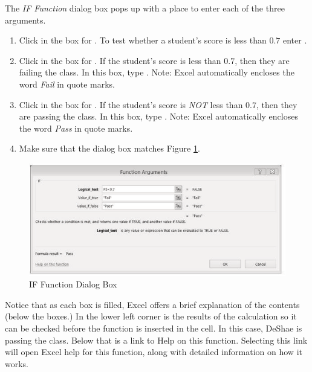The \textit{IF Function} dialog box pops up with a place to enter each of the three arguments.

\begin{enumbox}
	\begin{enumerate}
		\item Click in the box for . To test whether a student's score is less than $ 0.7 $ enter .
		\item Click in the box for . If the student's score is less than $ 0.7 $, then they are failing the class. In this box, type . Note: Excel automatically encloses the word \textit{Fail} in quote marks.
		\item Click in the box for . If the student's score is \textit{NOT} less than $ 0.7 $, then they are passing the class. In this box, type . Note: Excel automatically encloses the word \textit{Pass} in quote marks.
		\item Make sure that the dialog box matches Figure \ref{03:fig10}.
	\end{enumerate}
\end{enumbox}
	
\begin{figure}[H]
	\centering
	\includegraphics[width=\maxwidth{.95\linewidth}]{gfx/ch03_fig10}
	\caption{IF Function Dialog Box}
	\label{03:fig10}
\end{figure}

Notice that as each box is filled, Excel offers a brief explanation of the contents (below the boxes.) In the lower left corner is the results of the calculation so it can be checked before the function is inserted in the cell. In this case, DeShae is passing the class. Below that is a link to Help on this function. Selecting this link will open Excel help for this function, along with detailed information on how it works.

